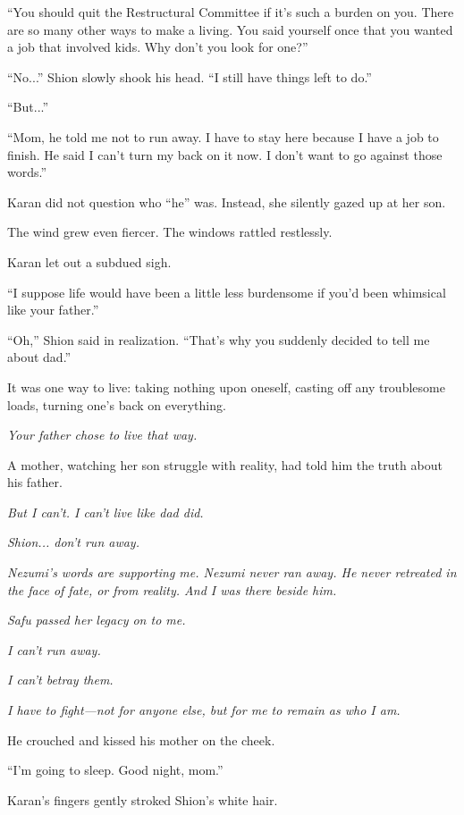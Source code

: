 ``You should quit the Restructural Committee if it's such a burden on
you. There are so many other ways to make a living. You said yourself
once that you wanted a job that involved kids. Why don't you look for
one?''

``No...'' Shion slowly shook his head. ``I still have things left to
do.''

``But...''

``Mom, he told me not to run away. I have to stay here because I have a
job to finish. He said I can't turn my back on it now. I don't want to
go against those words.''

Karan did not question who ``he'' was. Instead, she silently gazed up at
her son.

The wind grew even fiercer. The windows rattled restlessly.

Karan let out a subdued sigh.

\mybreak

``I suppose life would have been a little less burdensome if you'd been
whimsical like your father.''

``Oh,'' Shion said in realization. ``That's why you suddenly decided to
tell me about dad.''

It was one way to live: taking nothing upon oneself, casting off any
troublesome loads, turning one's back on everything.

\emph{Your father chose to live that way.}

A mother, watching her son struggle with reality, had told him the truth
about his father.

\emph{But I can't. I can't live like dad did.}

\myspace

\emph{Shion... don't run away.}

\myspace

\emph{Nezumi's words are supporting me. Nezumi never ran away. He never
retreated in the face of fate, or from reality. And I was there beside
him.}

\emph{Safu passed her legacy on to me.}

\emph{I can't run away.}

\emph{I can't betray them.}

\emph{I have to fight---not for anyone else, but for me to remain as who I am.}

He crouched and kissed his mother on the cheek.

``I'm going to sleep. Good night, mom.''

Karan's fingers gently stroked Shion's white hair.

